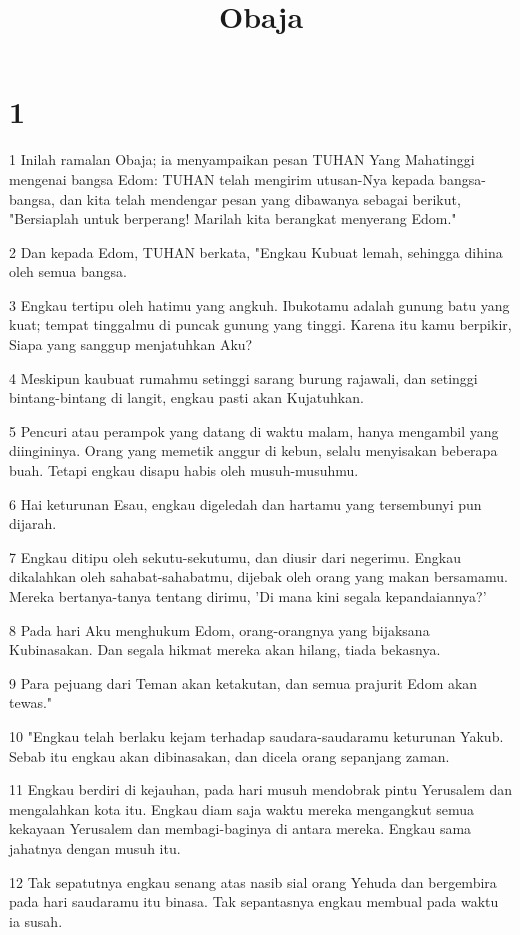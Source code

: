 

\title{Obaja}


\chapter{1}

\par 1 Inilah ramalan Obaja; ia menyampaikan pesan TUHAN Yang Mahatinggi mengenai bangsa Edom: TUHAN telah mengirim utusan-Nya kepada bangsa-bangsa, dan kita telah mendengar pesan yang dibawanya sebagai berikut, "Bersiaplah untuk berperang! Marilah kita berangkat menyerang Edom."
\par 2 Dan kepada Edom, TUHAN berkata, "Engkau Kubuat lemah, sehingga dihina oleh semua bangsa.
\par 3 Engkau tertipu oleh hatimu yang angkuh. Ibukotamu adalah gunung batu yang kuat; tempat tinggalmu di puncak gunung yang tinggi. Karena itu kamu berpikir, Siapa yang sanggup menjatuhkan Aku?
\par 4 Meskipun kaubuat rumahmu setinggi sarang burung rajawali, dan setinggi bintang-bintang di langit, engkau pasti akan Kujatuhkan.
\par 5 Pencuri atau perampok yang datang di waktu malam, hanya mengambil yang diingininya. Orang yang memetik anggur di kebun, selalu menyisakan beberapa buah. Tetapi engkau disapu habis oleh musuh-musuhmu.
\par 6 Hai keturunan Esau, engkau digeledah dan hartamu yang tersembunyi pun dijarah.
\par 7 Engkau ditipu oleh sekutu-sekutumu, dan diusir dari negerimu. Engkau dikalahkan oleh sahabat-sahabatmu, dijebak oleh orang yang makan bersamamu. Mereka bertanya-tanya tentang dirimu, 'Di mana kini segala kepandaiannya?'
\par 8 Pada hari Aku menghukum Edom, orang-orangnya yang bijaksana Kubinasakan. Dan segala hikmat mereka akan hilang, tiada bekasnya.
\par 9 Para pejuang dari Teman akan ketakutan, dan semua prajurit Edom akan tewas."
\par 10 "Engkau telah berlaku kejam terhadap saudara-saudaramu keturunan Yakub. Sebab itu engkau akan dibinasakan, dan dicela orang sepanjang zaman.
\par 11 Engkau berdiri di kejauhan, pada hari musuh mendobrak pintu Yerusalem dan mengalahkan kota itu. Engkau diam saja waktu mereka mengangkut semua kekayaan Yerusalem dan membagi-baginya di antara mereka. Engkau sama jahatnya dengan musuh itu.
\par 12 Tak sepatutnya engkau senang atas nasib sial orang Yehuda dan bergembira pada hari saudaramu itu binasa. Tak sepantasnya engkau membual pada waktu ia susah.
